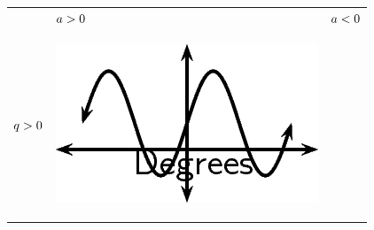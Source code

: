         \begin{center}
      \label{m39414*uid46}
    \noindent
      \tablelasttail{}
      \begin{xtabular*}{\mytablewidth}[t]{|p{10\mystarwidth}|p{10\mystarwidth}|p{10\mystarwidth}|}\hline
         &
                  $a>{}0$
                 &
                  $a<{}0$
     \tabularnewline{}
                  $q>{}0$
                 &
    \setcounter{subfigure}{0}
\label{m39414*id85372}
    \begin{center}
    \label{m39414*id85372!!!underscore!!!media}\label{m39414*id85372!!!underscore!!!printimage}\includegraphics{col11306.imgs/m39414_MG10C15_019.png} %
      \vspace{2pt}
    \vspace{.1in}
    \end{center}    

\end{xtabular*}
\end{center}
